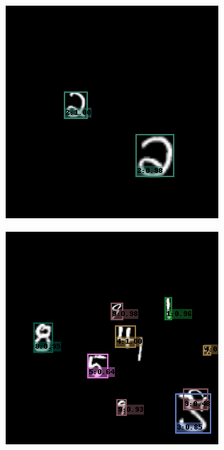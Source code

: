 \begin{figure}[h!]
    \centering
    \begin{subfigure}[b]{0.193\textwidth}
        \centering
        \includegraphics[width=\textwidth]{Images/mnist_output/0.png}
    \end{subfigure}
    \hfill
    \begin{subfigure}[b]{0.193\textwidth}
        \centering
        \includegraphics[width=\textwidth]{Images/mnist_output/1.png}

\end{subfigure}
\end{figure}
